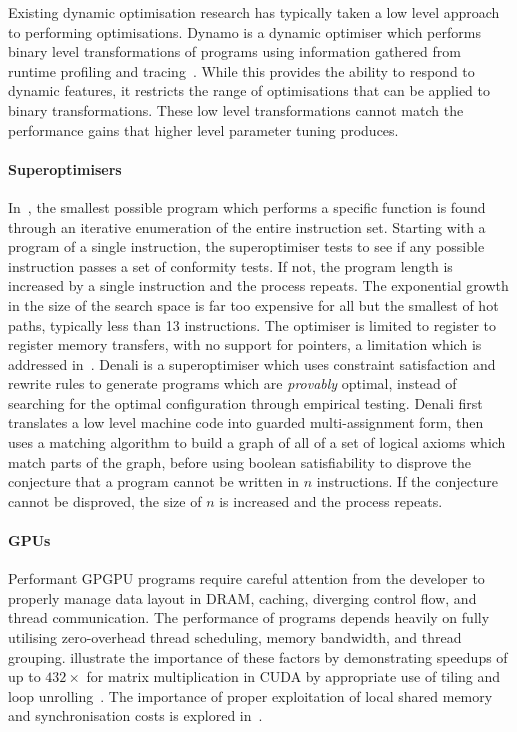 Existing dynamic optimisation research has typically taken a low level approach to performing optimisations. Dynamo is a dynamic optimiser which performs binary level transformations of programs using information gathered from runtime profiling and tracing~\cite{Bala2000}. While this provides the ability to respond to dynamic features, it restricts the range of optimisations that can be applied to binary transformations. These low level transformations cannot match the performance gains that higher level parameter tuning produces.

\paragraph{Superoptimisers} In~\cite{Massalin1987}, the smallest possible program which performs a specific function is found through an iterative enumeration of the entire instruction set. Starting with a program of a single instruction, the superoptimiser tests to see if any possible instruction passes a set of conformity tests. If not, the program length is increased by a single instruction and the process repeats. The exponential growth in the size of the search space is far too expensive for all but the smallest of hot paths, typically less than 13 instructions. The optimiser is limited to register to register memory transfers, with no support for pointers, a limitation which is addressed in~\cite{Joshi2002}. Denali is a superoptimiser which uses constraint satisfaction and rewrite rules to generate programs which are \emph{provably} optimal, instead of searching for the optimal configuration through empirical testing. Denali first translates a low level machine code into guarded multi-assignment form, then uses a matching algorithm to build a graph of all of a set of logical axioms which match parts of the graph, before using boolean satisfiability to disprove the conjecture that a program cannot be written in $n$ instructions. If the conjecture cannot be disproved, the size of $n$ is increased and the process repeats.

\paragraph{GPUs} Performant GPGPU programs require careful attention from the developer to properly manage data layout in DRAM, caching, diverging control flow, and thread communication. The performance of programs depends heavily on fully utilising zero-overhead thread scheduling, memory bandwidth, and thread grouping. \citeauthor{Ryoo2008a} illustrate the importance of these factors by demonstrating speedups of up to $432\times$ for matrix multiplication in CUDA by appropriate use of tiling and loop unrolling~\cite{Ryoo2008a}. The importance of proper exploitation of local shared memory and synchronisation costs is explored in~\cite{Lee2010}.

